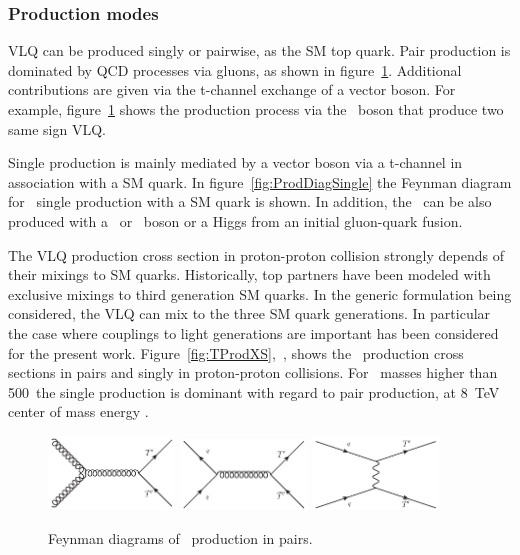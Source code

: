 \subsubsection{Production modes}
\label{sec:prod}

VLQ can be produced singly or pairwise, as the SM top quark. Pair production is dominated by QCD processes via gluons, as shown in figure~\ref{fig:ProdDiagPair}. Additional contributions are given via the t-channel exchange of a vector boson. For example, figure~\ref{fig:ProdDiagPair} shows the production process via the \Z~boson that produce two same sign VLQ.   

Single production is mainly mediated by a vector boson via a t-channel in association with a SM quark. In figure~\ref{fig:ProdDiagSingle} the Feynman diagram for \Tp~single production with a SM quark is shown. In addition, the \Tp~can be also produced with a \Z~or \W~boson or a Higgs from an initial gluon-quark fusion. 

The VLQ production cross section in proton-proton collision strongly depends of their mixings to SM quarks. Historically, top partners have been modeled with exclusive mixings to third generation SM quarks. In the generic formulation being considered, the VLQ can mix to the three SM quark generations. In particular the case where couplings to light generations are important has been considered for the present work. Figure~\ref{fig:TProdXS},~\cite{Cacciapaglia:2011fx}, shows the \Tp~production cross sections in pairs and singly in proton-proton collisions. For \Tp~masses higher than 500~\GeVcc the single production is dominant with regard to pair production, at 8~TeV center of mass energy . 

\begin{figure}[!Hhtbp]
  \begin{center}
    \includegraphics[width=0.3\textwidth]{figs/Gluon_fusion_T_pair.jpg}
    \includegraphics[width=0.3\textwidth]{figs/Quarks_schannel_T_pair.jpg}
    \includegraphics[width=0.3\textwidth]{figs/Gluon_tchannel_T_pair.jpg}
    \caption{Feynman diagrams of \Tp~production in pairs.}
    \label{fig:ProdDiagPair}
  \end{center}
\end{figure}

